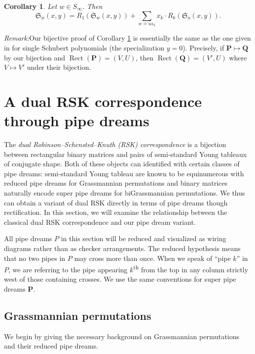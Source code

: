 \documentclass[11pt,reqno]{amsart} %
\newcommand{\frakS}{\mathfrak{S}}
\newcommand{\bfP}{\mathbf{P}}
\newcommand{\bfQ}{\mathbf{Q}}
\DeclareMathOperator{\Rect}{Rect} %
\newtheorem{corollary}[theorem]{Corollary}
\theoremstyle{definition}
\begin{document}
\begin{corollary}
\label{cor:R_k Schub recursion}
Let $w\in S_\infty$.
Then \[
    \frakS_w(x,y)
    = R_1\left(\frakS_w(x,y)\right)
    + \sum_{
        w \doteq us_k
    } x_k \cdot R_k \left(\frakS_u(x,y)\right).
\]
\end{corollary}

\noindent
\textit{Remark:}\quad Our bijective proof of Corollary \ref{cor:R_k Schub recursion} is essentially the same as the one given in \cite{NadeauSpinkTewari24} for single Schubert polynomials (the specialization $y = 0$).
Precisely, if $\bfP\mapsto \bfQ$ by our bijection and $\Rect(\bfP) = (V,U)$, then $\Rect(\bfQ) = (V',U)$ where $V\mapsto V'$ under their bijection.
\vspace{4pt}

\section{A dual RSK correspondence through pipe dreams}
\label{sect:RSK}


The \textit{dual Robinson--Schensted--Knuth (RSK) correspondence} is a bijection between rectangular binary matrices and pairs of semi-standard Young tableaux of conjugate shape.
Both of these objects can identified with certain classes of pipe dreams: semi-standard Young tableau are known to be equinumerous with reduced pipe dreams for Grassmannian permutations and binary matrices naturally encode super pipe dreams for biGrassmannian permutations.
We thus can obtain a variant of dual RSK directly in terms of pipe dreams though rectification.
In this section, we will examine the relationship between the classical dual RSK correspondence and our pipe dream variant.

All pipe dreams $P$ in this section will be reduced and visualized as wiring diagrams rather than as checker arrangements.
The reduced hypothesis means that no two pipes in $P$ may cross more than once.
When we speak of ``pipe $k$'' in $P$, we are referring to the pipe appearing $k$\textsuperscript{th} from the top in any column strictly west of those containing crosses.
We use the same conventions for super pipe dreams $\bfP$.


\subsection{Grassmannian permutations}
\label{subsect:grass permutations}

We begin by giving the necessary background on Grassmannian permutations and their reduced pipe dreams.
\end{document}
